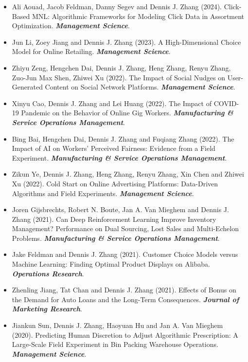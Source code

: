 \documentclass[10pt]{article}
\begin{document}
\begin{itemize}
    \item Ali Aouad, Jacob Feldman, Danny Segev and Dennis J. Zhang (2024). Click-Based MNL: Algorithmic Frameworks for Modeling Click Data in Assortment Optimization. \emph{\bf Management Science}.

    \item Jun Li, Zoey Jiang and Dennis J. Zhang (2023). A High-Dimensional Choice Model for Online Retailing. \emph{\bf Management Science}.


    \item Zhiyu Zeng, Hengchen Dai, Dennis J. Zhang, Heng Zhang, Renyu Zhang, Zuo-Jun Max Shen, Zhiwei Xu (2022). The Impact of Social Nudges on User-Generated Content on Social Network Platforms. \emph{\bf Management Science}.

    \item Xinyu Cao, Dennis J. Zhang and Lei Huang (2022). The Impact of COVID-19 Pandemic on the Behavior of Online Gig Workers. \emph{\bf Manufacturing \& Service Operations Management}.

    \item Bing Bai, Hengchen Dai, Dennis J. Zhang and Fuqiang Zhang (2022). The Impact of AI on Workers' Perceived Fairness: Evidence from a Field Experiment. \emph{\bf Manufacturing \& Service Operations Management}.
    
    \item Zikun Ye, Dennis J. Zhang, Heng Zhang, Renyu Zhang, Xin Chen and Zhiwei Xu (2022). Cold Start on Online Advertising Platforms: Data-Driven Algorithms and Field Experiments. \emph{\bf Management Science}.  

    \item Joren Gijsbrechts, Robert N. Boute, Jan A. Van Mieghem and Dennis J. Zhang (2021). Can Deep Reinforcement Learning Improve Inventory Management? Performance on Dual Sourcing, Lost Sales and Multi-Echelon Problems. \emph{\bf Manufacturing \& Service Operations Management}.

    \item Jake Feldman and Dennis J. Zhang (2021). Customer Choice Models versus Machine Learning: Finding Optimal Product Displays on Alibaba. \emph{\bf Operations Research}.

    \item Zhenling Jiang, Tat Chan and Dennis J. Zhang (2021). Effects of Bonus on the Demand for Auto Loans and the Long-Term Consequences. \emph{\bf Journal of Marketing Research}.

    \item Jiankun Sun, Dennis J. Zhang, Haoyuan Hu and Jan A. Van Mieghem (2020). Predicting Human Discretion to Adjust Algorithmic Prescription: A Large-Scale Field Experiment in Bin Packing Warehouse Operations. \emph{\bf Management Science}.


\end{itemize}
\end{document}
